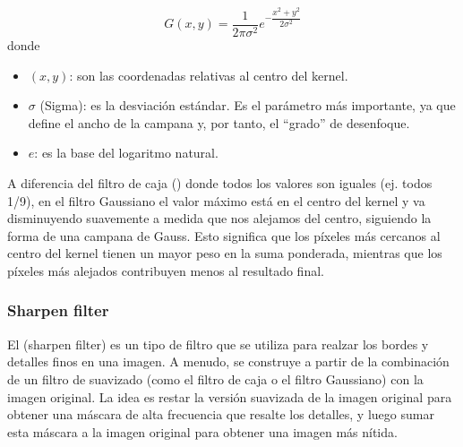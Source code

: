 $$G(x, y) = \frac{1}{2\pi\sigma^2} e^{-\dfrac{x^2 + y^2}{2\sigma^2}}$$
donde
\begin{itemize}
    \item $(x, y)$: son las coordenadas relativas al centro del kernel.
    \item $\sigma$ (Sigma): es la desviación estándar. Es el parámetro más importante, ya que define el ancho de la campana y, por tanto, el ``grado'' de desenfoque.
    \item $e$: es la base del logaritmo natural.
\end{itemize}
A diferencia del filtro de caja () donde todos los valores son iguales (ej. todos 1/9), en el filtro Gaussiano el valor máximo está en el centro del kernel y va disminuyendo suavemente a medida que nos alejamos del centro, siguiendo la forma de una campana de Gauss. Esto significa que los píxeles más cercanos al centro del kernel tienen un mayor peso en la suma ponderada, mientras que los píxeles más alejados contribuyen menos al resultado final. \\


\subsubsection{Sharpen filter}
\noindent
El  (sharpen filter) es un tipo de filtro que se utiliza para realzar los bordes y detalles finos en una imagen. A menudo, se construye a partir de la combinación de un filtro de suavizado (como el filtro de caja o el filtro Gaussiano) con la imagen original. La idea es restar la versión suavizada de la imagen original para obtener una máscara de alta frecuencia que resalte los detalles, y luego sumar esta máscara a la imagen original para obtener una imagen más nítida. \\

